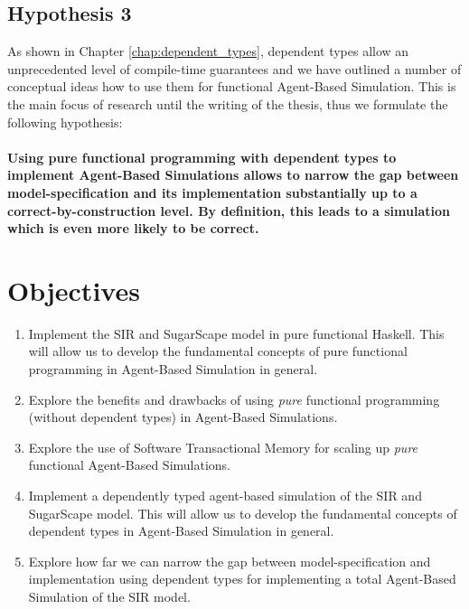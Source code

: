 \subsection{Hypothesis 3}
As shown in Chapter \ref{chap:dependent_types}, dependent types allow an unprecedented level of compile-time guarantees and we have outlined a number of conceptual ideas how to use them for functional Agent-Based Simulation. This is the main focus of research until the writing of the thesis, thus we formulate the following hypothesis:

\paragraph{Using pure functional programming with dependent types to implement Agent-Based Simulations allows to narrow the gap between model-specification and its implementation substantially up to a correct-by-construction level. By definition, this leads to a simulation which is even more likely to be correct.}

\section{Objectives}
\begin{enumerate}
	\item Implement the SIR and SugarScape model in pure functional Haskell. This will allow us to develop the fundamental concepts of pure functional programming in Agent-Based Simulation in general.

	\item Explore the benefits and drawbacks of using \textit{pure} functional programming (without dependent types) in Agent-Based Simulations.

	\item Explore the use of Software Transactional Memory for scaling up \textit{pure} functional Agent-Based Simulations.

	\item Implement a dependently typed agent-based simulation of the SIR and SugarScape model. This will allow us to develop the fundamental concepts of dependent types in Agent-Based Simulation in general.

	\item Explore how far we can narrow the gap between model-specification and implementation using dependent types for implementing a total Agent-Based Simulation of the SIR model.
\end{enumerate}